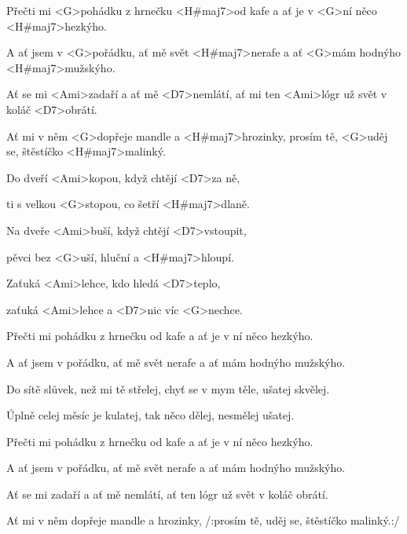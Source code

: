 

\zs
Přečti mi <G>pohádku z hrnečku <H#maj7>od kafe
a ať je v <G>ní něco <H#maj7>hezkýho.

A ať jsem v <G>pořádku, ať mě svět <H#maj7>nerafe
a ať <G>mám hodnýho <H#maj7>mužskýho.

Ať se mi <Ami>zadaří a ať mě <D7>nemlátí,
ať mi ten <Ami>lógr už svět v koláč <D7>obrátí.

Ať mi v něm <G>dopřeje mandle a <H#maj7>hrozinky,
prosím tě, <G>uděj se, štěstíčko <H#maj7>malinký.
\ks

\zr
Do dveří <Ami>kopou, když chtějí <D7>za ně,

ti s velkou <G>stopou, co šetří <H#maj7>dlaně.

Na dveře <Ami>buší, když chtějí <D7>vstoupit,

pěvci bez <G>uší, hluční a <H#maj7>hloupí.

Zaťuká <Ami>lehce, kdo hledá <D7>teplo,

zaťuká <Ami>lehce a <D7>nic víc <G>nechce.
\kr

\zs
Přečti mi pohádku z hrnečku od kafe
a ať je v ní něco hezkýho.

A ať jsem v pořádku, ať mě svět nerafe
a ať mám hodnýho mužskýho.

Do sítě slůvek, než mi tě střelej,
chyť se v mym těle, ušatej skvělej.

Úplně celej měsíc je kulatej,
tak něco dělej, nesmělej ušatej.
\ks

\zr \kr

\zs
Přečti mi pohádku z hrnečku od kafe
a ať je v ní něco hezkýho.

A ať jsem v pořádku, ať mě svět nerafe
a ať mám hodnýho mužskýho.

Ať se mi zadaří a ať mě nemlátí,
ať ten lógr už svět v koláč obrátí.

Ať mi v něm dopřeje mandle a hrozinky,
/:prosím tě, uděj se, štěstíčko malinký.:/
\ks

\kp
